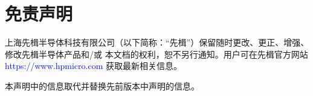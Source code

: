\documentclass[AutoFakeBold,hyperref, UTF8]{ctexart}
\begin{document}
\begin{comment}
	
	
	
	
	
	
	
	
	
	
	
	
	
	
	
	
	
	
	
	
	
	
	
	
	
		
	
	
	
	
	
	
	
	
	
	
		
	
	
	
	
	
	\end{comment}


	\newpage
	\def\sectionabstract{免责声明}
	\section*{免责声明}
	上海先楫半导体科技有限公司（以下简称：“先楫”）保留随时更改、更正、增强、修改先楫半导体产品和/或
	本文档的权利，恕不另行通知。用户可在先楫官方网站
	\hypertarget{https://www.hpmicro.com}{\textcolor{blue}{https://www.hpmicro.com}}
	获取最新相关信息。\par
	
	
	本声明中的信息取代并替换先前版本中声明的信息。\par
        
        
        

     
\end{document}
